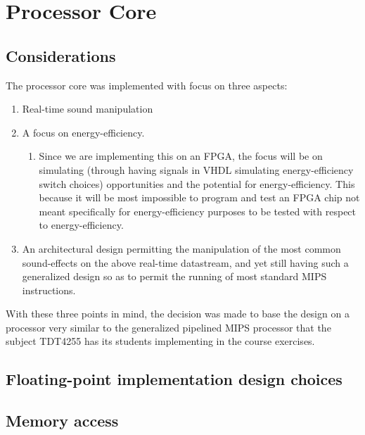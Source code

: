 \FloatBarrier
\section{Processor Core}\label{section:fpga-processor-core}

\FloatBarrier
\subsection{Considerations}

The processor core was implemented with focus on three aspects:

\begin{enumerate}
	\item Real-time sound manipulation
	\item A focus on energy-efficiency.
	\begin{enumerate}
		\item Since we are implementing this on an FPGA, the focus will be on
simulating (through having signals in VHDL simulating energy-efficiency switch
choices) opportunities and the potential for energy-efficiency. This because
it will be most impossible to program and test an FPGA chip not meant
specifically for energy-efficiency purposes to be tested with respect to
energy-efficiency.
	\end{enumerate}
	\item An architectural design permitting the manipulation of the most common
sound-effects on the above real-time datastream, and yet still having such a
generalized design so as to permit the running of most standard MIPS
instructions.
\end{enumerate}

With these three points in mind, the decision was made to base the design on a
processor very similar to the generalized pipelined MIPS processor that the
subject TDT4255\cite{tdt4255} has its students implementing in the course
exercises.

\FloatBarrier
\subsection{Floating-point implementation design choices}

\FloatBarrier
\subsection{Memory access}
